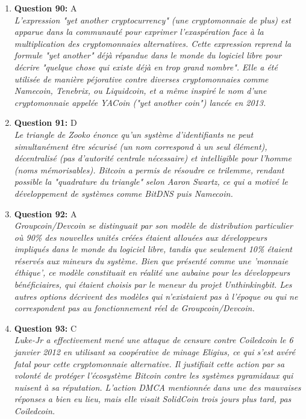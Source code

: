 \documentclass[12pt,a4paper]{article}
\begin{document}
\begin{enumerate}
\item \textbf{Question 90:} A
\\ \textit{L'expression "yet another cryptocurrency" (une cryptomonnaie de plus) est apparue dans la communauté pour exprimer l'exaspération face à la multiplication des cryptomonnaies alternatives. Cette expression reprend la formule "yet another" déjà répandue dans le monde du logiciel libre pour décrire "quelque chose qui existe déjà en trop grand nombre". Elle a été utilisée de manière péjorative contre diverses cryptomonnaies comme Namecoin, Tenebrix, ou Liquidcoin, et a même inspiré le nom d'une cryptomonnaie appelée YACoin ("yet another coin") lancée en 2013.}

\item \textbf{Question 91:} D
\\ \textit{Le triangle de Zooko énonce qu'un système d'identifiants ne peut simultanément être sécurisé (un nom correspond à un seul élément), décentralisé (pas d'autorité centrale nécessaire) et intelligible pour l'homme (noms mémorisables). Bitcoin a permis de résoudre ce trilemme, rendant possible la "quadrature du triangle" selon Aaron Swartz, ce qui a motivé le développement de systèmes comme BitDNS puis Namecoin.}

\item \textbf{Question 92:} A
\\ \textit{Groupcoin/Devcoin se distinguait par son modèle de distribution particulier où 90\% des nouvelles unités créées étaient allouées aux développeurs impliqués dans le monde du logiciel libre, tandis que seulement 10\% étaient réservés aux mineurs du système. Bien que présenté comme une 'monnaie éthique', ce modèle constituait en réalité une aubaine pour les développeurs bénéficiaires, qui étaient choisis par le meneur du projet Unthinkingbit. Les autres options décrivent des modèles qui n'existaient pas à l'époque ou qui ne correspondent pas au fonctionnement réel de Groupcoin/Devcoin.}

\item \textbf{Question 93:} C
\\ \textit{Luke-Jr a effectivement mené une attaque de censure contre Coiledcoin le 6 janvier 2012 en utilisant sa coopérative de minage Eligius, ce qui s'est avéré fatal pour cette cryptomonnaie alternative. Il justifiait cette action par sa volonté de protéger l'écosystème Bitcoin contre les systèmes pyramidaux qui nuisent à sa réputation. L'action DMCA mentionnée dans une des mauvaises réponses a bien eu lieu, mais elle visait SolidCoin trois jours plus tard, pas Coiledcoin.}


\end{enumerate}
\end{document}

